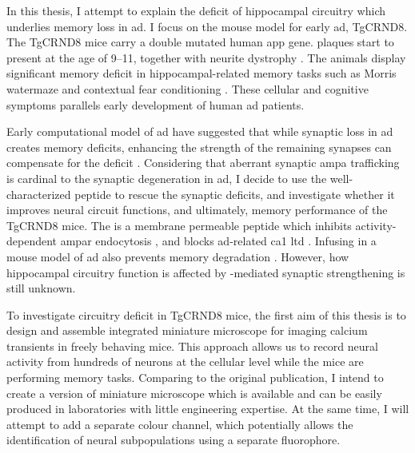 In this thesis, I attempt to explain the deficit of hippocampal circuitry which underlies memory loss in \gls{ad}. I focus on the mouse model for early \gls{ad}, TgCRND8. The TgCRND8 mice carry a double mutated human \gls{app} gene. \abeta{} plaques start to present at the age of \SIrange{9}{11}{\week}, together with neurite dystrophy \citep{chishti01}. The animals display significant memory deficit in hippocampal-related memory tasks such as Morris watermaze and contextual fear conditioning \citep{hyde05, yiu11}. These cellular and cognitive symptoms parallels early development of human \gls{ad} patients. 

Early computational model of \gls{ad} have suggested that while synaptic loss in \gls{ad} creates memory deficits, enhancing the strength of the remaining synapses can compensate for the deficit \citep{horn93}. Considering that aberrant synaptic \gls{ampa} trafficking is cardinal to the synaptic degeneration in \gls{ad}, I decide to use the well-characterized peptide \tglu to rescue the synaptic deficits, and investigate whether it improves neural circuit functions, and ultimately, memory performance of the TgCRND8 mice. The \tglu is a membrane permeable peptide which inhibits activity-dependent \gls{ampar} endocytosis \citep{ahmadian04}, and blocks \gls{ad}-related \gls{ca1} \gls{ltd} \citep{dong15}. Infusing \tglu in a mouse model of \gls{ad} also prevents memory degradation \citep{dong15}. However, how hippocampal circuitry function is affected by \tglu-mediated synaptic strengthening is still unknown. 

To investigate circuitry deficit in TgCRND8 mice, the first aim of this thesis is to design and assemble integrated miniature microscope for imaging calcium transients in freely behaving mice. This approach allows us to record neural activity from hundreds of neurons at the cellular level while the mice are performing memory tasks. Comparing to the original \citet{ghosh11} publication, I intend to create a version of miniature microscope which is available and can be easily produced in laboratories with little engineering expertise. At the same time, I will attempt to add a separate colour channel, which potentially allows the identification of neural subpopulations using a separate fluorophore. 

